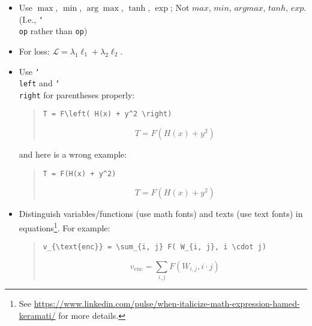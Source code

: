 \begin{itemize}
  \item
    Use $\max$, $\min$, $\arg \max$, $\tanh$, $\exp$; Not $max$, $min$, $argmax$, $tanh$, $exp$. (I.e., \texttt{\char`\\ op} rather than \texttt{op})
  \item For loss: $\mathcal{L} = \lambda_1 \ell_1 + \lambda_2 \ell_2$.
  \item
    Use \texttt{\char`\\left} and \texttt{\char`\\right} for parentheses properly:
  \begin{quote}\begin{scriptsize}
    \begin{verbatim}
T = F\left( H(x) + y^2 \right)
    \end{verbatim}
    \begin{equation}
      T = F\left( H(x) + y^2 \right)
    \end{equation}
  \end{scriptsize}\end{quote}
    and here is a wrong example:
  \begin{quote}\begin{scriptsize}
    \begin{verbatim}
T = F(H(x) + y^2)
    \end{verbatim}

    \begin{equation}
      T = F(H(x) + y^2)
    \end{equation}
  \end{scriptsize}\end{quote}

  \item Distinguish variables/functions (use math fonts) and texts (use text fonts) in equations\footnote[2]{
      See \url{https://www.linkedin.com/pulse/when-italicize-math-expression-hamed-keramati/} for more details.
    }. For example:
  \begin{quote}\begin{scriptsize}
    \begin{verbatim}
v_{\text{enc}} = \sum_{i, j} F( W_{i, j}, i \cdot j)
    \end{verbatim}

    \begin{equation}
      v_{\text{enc}} = \sum_{i, j} F( W_{i, j}, i \cdot j)
    \end{equation}
  \end{scriptsize}\end{quote}



\end{itemize}
